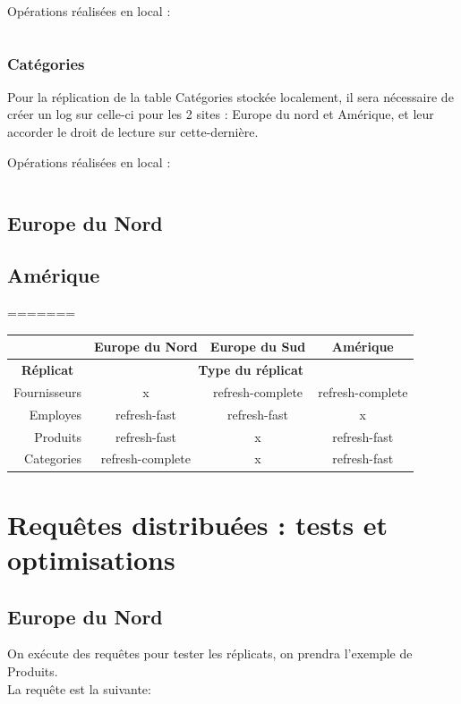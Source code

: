 \documentclass[10pt,a4paper]{article}
\theoremstyle{plain}
\begin{document}
Opérations réalisées en local :
\inputminted{sql}{EUS_VI-1.sql}

\subsubsection{Catégories}
Pour la réplication de la table Catégories stockée localement, il sera nécessaire de créer un log sur celle-ci pour les 2 sites : Europe du nord et Amérique, et leur accorder le droit de lecture sur cette-dernière.

Opérations réalisées en local :
\inputminted{sql}{EUS_VI-2.sql}
\newpage

\subsection{Europe du Nord}
\newpage 

\subsection{Amérique}
\newpage
=======

\begin{table}[H]
\begin{tabular}{|r|c|c|c|}
\hline
\multicolumn{1}{|l|}{} & \textbf{Europe du Nord} & \textbf{Europe du Sud} & \textbf{Amérique} \\ \hline
\multicolumn{1}{|c|}{\textbf{Réplicat}} & \multicolumn{3}{c|}{\textbf{Type du réplicat}} \\ \hline
Fournisseurs & x & refresh-complete & refresh-complete \\ \hline
Employes & refresh-fast & refresh-fast & x \\ \hline
Produits & refresh-fast & x & refresh-fast \\ \hline
Categories & refresh-complete & x & refresh-fast \\ \hline
\end{tabular}
\end{table}

\section{Requêtes distribuées : tests et optimisations}

\subsection{Europe du Nord}

On exécute des requêtes pour tester les réplicats, on prendra l'exemple de Produits.\\La requête est la suivante:
\end{document}
